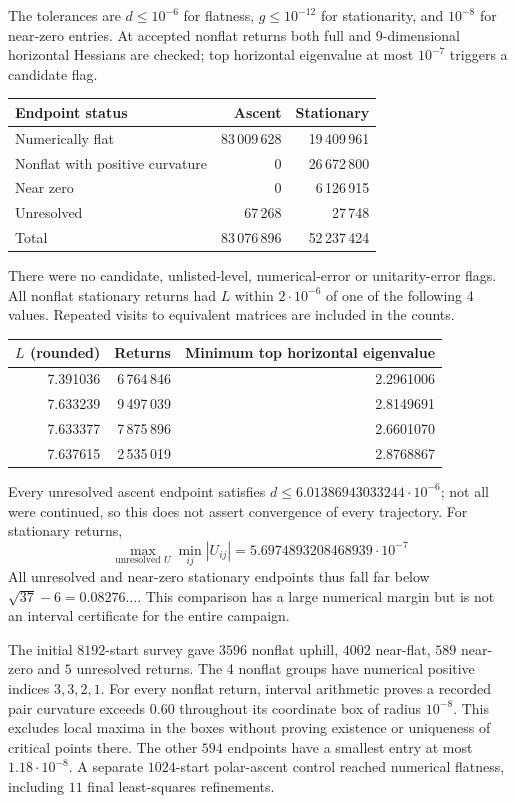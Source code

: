 \documentclass[11pt,a4paper]{article}
\begin{document}
The tolerances are $d\le10^{-6}$ for flatness, $g\le10^{-12}$ for
stationarity, and $10^{-8}$ for near-zero entries. At accepted nonflat
returns both full and 9-dimensional horizontal Hessians are checked;
top horizontal eigenvalue at most $10^{-7}$ triggers a candidate flag.
\begin{center}
\begin{tabular}{lrr}
\toprule
Endpoint status & Ascent & Stationary\\
\midrule
Numerically flat &83\,009\,628&19\,409\,961\\
Nonflat with positive curvature &0&26\,672\,800\\
Near zero &0&6\,126\,915\\
Unresolved &67\,268&27\,748\\
\midrule
Total &83\,076\,896&52\,237\,424\\
\bottomrule
\end{tabular}
\end{center}
There were no candidate, unlisted-level, numerical-error or
unitarity-error flags. All nonflat stationary returns had $L$ within
$2\cdot10^{-6}$ of one of the following 4 values. Repeated visits
to equivalent matrices are included in the counts.
\begin{center}
\begin{tabular}{rrr}
\toprule
$L$ (rounded) & Returns & Minimum top horizontal eigenvalue\\
\midrule
7.391036 &6\,764\,846 &2.2961006\\
7.633239 &9\,497\,039 &2.8149691\\
7.633377 &7\,875\,896 &2.6601070\\
7.637615 &2\,535\,019 &2.8768867\\
\bottomrule
\end{tabular}
\end{center}
Every unresolved ascent endpoint satisfies
$d\le6.01386943033244\cdot10^{-6}$; not all were continued, so this
does not assert convergence of every trajectory. For stationary returns,
\[
 \max_{\text{unresolved }U}\min_{ij}|U_{ij}|
 =5.6974893208468939\cdot10^{-7}
\]
All unresolved and near-zero stationary endpoints thus fall far below
$\sqrt{37}-6=0.08276\ldots$. This comparison has a large numerical
margin but is not an interval certificate for the entire campaign.

The initial $8192$-start survey gave $3596$ nonflat uphill, $4002$
near-flat, $589$ near-zero and $5$ unresolved returns. The 4 nonflat
groups have numerical positive indices $3,3,2,1$. For every nonflat
return, interval arithmetic proves a recorded pair curvature exceeds
$0.60$ throughout its coordinate box of radius $10^{-8}$. This excludes
local maxima in the boxes without proving existence or uniqueness of
critical points there. The other $594$ endpoints have a smallest entry
at most $1.18\cdot10^{-8}$. A separate $1024$-start polar-ascent control
reached numerical flatness, including $11$ final least-squares refinements.
\end{document}
